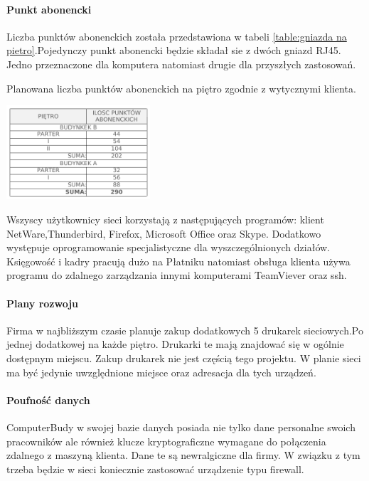 \documentclass{report}
\begin{document}
\paragraph{Punkt abonencki} Liczba punktów abonenckich została przedstawiona w tabeli \ref{table:gniazda na pietro}.Pojedynczy punkt
abonencki będzie składał sie z dwóch gniazd RJ45. Jedno przeznaczone dla komputera natomiast drugie dla przyszłych zastosowań.

\begin{table}[H]

\centering
\caption{Planowana liczba punktów abonenckich na piętro zgodnie z wytycznymi klienta. \label{table:gniazda na pietro}}

\includegraphics[width=0.4\textwidth]{./obrazki/plany_wew/gniazda_na_pietro.png} 
 
\end{table}


Wszyscy użytkownicy sieci korzystają z następujących programów: klient NetWare,Thunderbird, Firefox, Microsoft Office oraz Skype. Dodatkowo występuje 
oprogramowanie specjalistyczne dla wyszczególnionych działów. Księgowość i kadry pracują dużo na Płatniku natomiast obsługa klienta używa programu
do zdalnego zarządzania innymi komputerami TeamViever oraz ssh.

\paragraph{Plany rozwoju}Firma w najbliższym czasie planuje zakup dodatkowych 5 drukarek sieciowych.Po jednej dodatkowej na każde piętro. Drukarki te mają znajdować się
w ogólnie dostępnym miejscu. Zakup drukarek nie jest częścią tego projektu. W planie sieci ma być jedynie uwzględnione miejsce oraz adresacja dla tych urządzeń.

\paragraph{Poufność danych}ComputerBudy w swojej bazie danych posiada nie tylko dane personalne swoich pracowników ale również klucze kryptograficzne wymagane do połączenia zdalnego
z maszyną klienta. Dane te są newralgiczne dla firmy. W związku z tym trzeba będzie w sieci koniecznie zastosować urządzenie typu firewall.
\end{document}
